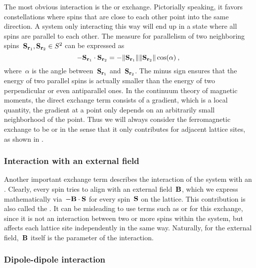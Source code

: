 The most obvious interaction is the  or 
exchange.  Pictorially speaking, it favors constellations where spins that are
close to each other point into the same direction. A system only interacting
this way will end up in a state where all spins are parallel to each other. The
measure for parallelism of two neighboring spins~$\S_{\r_1}, \S_{\r_2} \in S^2$
can be expressed as
%
\begin{equation}
  -\S_{\r_1} \cdot \S_{\r_2} =
  -\norm{\S_{\r_1}} \norm{\S_{\r_2}} \cos(\alpha) \:,
\end{equation}
%
where~$\alpha$ is the angle between~$\S_{\r_1}$ and~$\S_{\r_2}$. The minus sign
ensures that the energy of two parallel spins is actually smaller than the
energy of two perpendicular or even antiparallel ones.  In the continuum theory
of magnetic moments, the direct exchange term consists of a gradient, which is a
local quantity, \ie{} the gradient at a point only depends on an arbitrarily
small neighborhood of the point. Thus we will always consider the ferromagnetic
exchange to be  or  in the sense that it
only contributes for adjacent lattice sites, as shown in .

\subsubsection{Interaction with an external field}

Another important exchange term describes the interaction of the system with an
. Clearly, every spin tries to align with an
external field~$\B$, which we express mathematically via~$-\B \cdot \S$ for
every spin~$\S$ on the lattice. This contribution is also called the
. It can be misleading to use terms such as
 or  for this exchange, since it is not
an interaction between two or more spins within the system, but affects each
lattice site independently in the same way. Naturally, for the external
field,~$\B$ itself is the parameter of the interaction.

\subsubsection{Dipole-dipole interaction}

